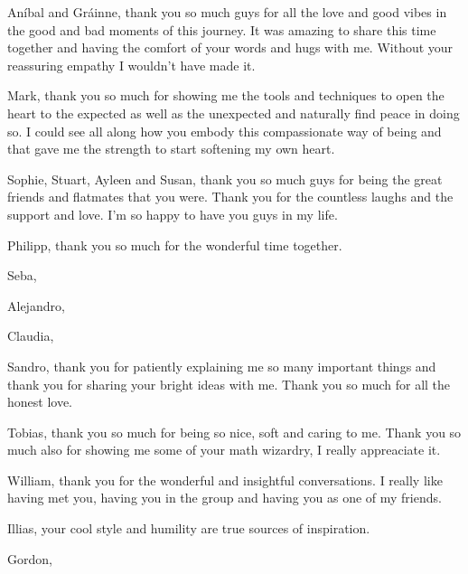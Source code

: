 \documentclass[phd,lfcs]{infthesis}
\begin{document}
\begin{preliminary}
\begin{acknowledgements}
  An\'ibal and Gr\'ainne, thank you so much guys for all the love
  and good vibes in the good and bad moments of this journey.
  It was amazing to share this time together
  and having the comfort of your words and hugs with me.
  Without your reassuring empathy I wouldn't have made it.

  Mark, thank you so much
  for showing me the tools and techniques to open the heart
  to the expected as well as the unexpected
  and naturally find peace in doing so.
  I could see all along how you embody this compassionate way of being
  and that gave me the strength to start softening my own heart.

  Sophie, Stuart, Ayleen and Susan, thank you so much guys for
  being the great friends and flatmates that you were.
  Thank you for the countless laughs and the support and love.
  I'm so happy to have you guys in my life.

  Philipp, thank you so much for the wonderful time together.

  Seba,

  Alejandro,

  Claudia,

  Sandro, thank you for patiently explaining me so many important things
  and thank you for sharing your bright ideas with me.
  Thank you so much for all the honest love.

  Tobias, thank you so much for being so nice, soft and caring to me. %
  Thank you so much also for showing me some of your math wizardry,
  I really appreaciate it.

  William, thank you for the wonderful and insightful conversations. %
  I really like having met you, having you in the group
  and having you as one of my friends.

  Illias, your cool style and humility are true sources of inspiration.

  Gordon,


\end{acknowledgements}
\end{preliminary}
\end{document}
